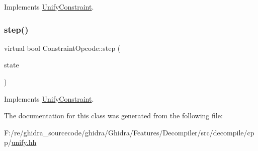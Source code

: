 Implements \mbox{\hyperlink{class_unify_constraint_a774f6a611a96384766cb8e8d8f5ff41f}{Unify\+Constraint}}.

\mbox{\label{class_constraint_opcode_adab0b976a316fe14cfd1f6169a2d6fe3}} 
\subsubsection{\texorpdfstring{step()}{step()}}
{\footnotesize\ttfamily virtual bool Constraint\+Opcode\+::step (\begin{DoxyParamCaption}\item[{\mbox{\hyperlink{class_unify_state}{Unify\+State}} \&}]{state }\end{DoxyParamCaption})\hspace{0.3cm}{\ttfamily [virtual]}}



Implements \mbox{\hyperlink{class_unify_constraint_ad9ab4ad91037f96bf803735d414d212d}{Unify\+Constraint}}.



The documentation for this class was generated from the following file\+:\begin{DoxyCompactItemize}
\item 
F\+:/re/ghidra\+\_\+sourcecode/ghidra/\+Ghidra/\+Features/\+Decompiler/src/decompile/cpp/\mbox{\hyperlink{unify_8hh}{unify.\+hh}}\end{DoxyCompactItemize}
